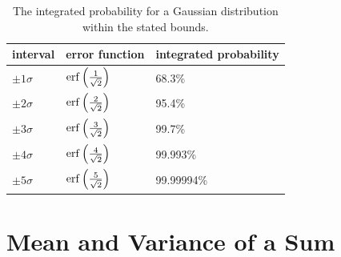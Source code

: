 \documentclass[12pt,oneside]{book}
\begin{document}
\begin{table}[thb]
\begin{center}
\begin{tabular}{lll}
interval & error function & integrated probability \\ 
\hline
$\pm1 \sigma$ & ${\rm erf}\left( \frac{1}{\sqrt{2}} \right)$ & 68.3\% \\
$\pm2 \sigma$ & ${\rm erf}\left( \frac{2}{\sqrt{2}} \right)$ & 95.4\% \\
$\pm3 \sigma$ & ${\rm erf}\left( \frac{3}{\sqrt{2}} \right)$ & 99.7\% \\
$\pm4 \sigma$ & ${\rm erf}\left( \frac{4}{\sqrt{2}} \right)$ & 99.993\% \\
$\pm5 \sigma$ & ${\rm erf}\left( \frac{5}{\sqrt{2}} \right)$ & 99.99994\% \\ 
\end{tabular}
\caption{\label{tbl:erf} The integrated probability for a Gaussian distribution within the stated bounds.} 
\end{center}
\end{table}

\section{Mean and Variance of a Sum}
\end{document}
